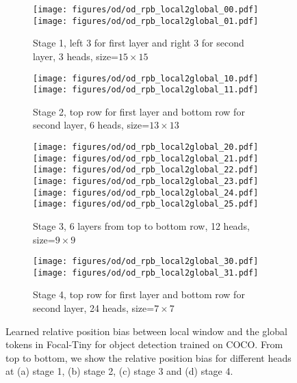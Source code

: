 \documentclass{article}
\begin{document}
\begin{figure}[t]
\begin{subfigure}{\textwidth}
  \texttt{[image: figures/od/od\_rpb\_local2global\_00.pdf]}
  \texttt{[image: figures/od/od\_rpb\_local2global\_01.pdf]}  
  \caption{Stage 1, left 3 for first layer and right 3 for second layer, 3 heads, size=$15\times 15$}
\end{subfigure}
\begin{subfigure}{\textwidth}
  \texttt{[image: figures/od/od\_rpb\_local2global\_10.pdf]}
  \texttt{[image: figures/od/od\_rpb\_local2global\_11.pdf]}  
\caption{Stage 2, top row for first layer and bottom row for second layer, 6 heads, size=$13\times 13$}
\end{subfigure}
\begin{subfigure}{\textwidth}
  \texttt{[image: figures/od/od\_rpb\_local2global\_20.pdf]}
  \texttt{[image: figures/od/od\_rpb\_local2global\_21.pdf]}    
  \texttt{[image: figures/od/od\_rpb\_local2global\_22.pdf]}    
  \texttt{[image: figures/od/od\_rpb\_local2global\_23.pdf]}    
  \texttt{[image: figures/od/od\_rpb\_local2global\_24.pdf]}    
  \texttt{[image: figures/od/od\_rpb\_local2global\_25.pdf]}      
\caption{Stage 3, 6 layers from top to bottom row, 12 heads, size=$9\times 9$}
\end{subfigure}
\begin{subfigure}{\textwidth}
  \texttt{[image: figures/od/od\_rpb\_local2global\_30.pdf]}    
  \texttt{[image: figures/od/od\_rpb\_local2global\_31.pdf]}      
  \caption{Stage 4, top row for first layer and bottom row for second layer, 24 heads, size=$7\times 7$}
\end{subfigure}
  \caption{Learned relative position bias between local window and the global tokens in Focal-Tiny for object detection trained on COCO. From top to bottom, we show the relative position bias for different heads at (a) stage 1, (b) stage 2, (c) stage 3 and (d) stage 4.}
  \label{fig:local2global_rpb_coco}
\end{figure}
\end{document}

